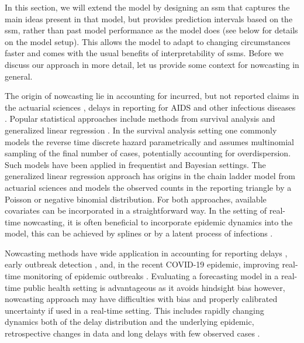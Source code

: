 In this section, we will extend the \ilmpropbig model by designing an \gls{ssm} that captures the main ideas present in that model, but provides prediction intervals based on the \gls{ssm}, rather than past model performance as the \ilmpropbig model does (see below for details on the model setup). This allows the model to adapt to changing circumstances faster and comes with the usual benefits of interpretability of \glspl{ssm}. Before we discuss our approach in more detail, let us provide some context for nowcasting in general.

The origin of nowcasting lie in accounting for incurred, but not reported claims in the actuarial sciences \citep{Kaminsky1987Prediction}, delays in reporting for AIDS \citep{Zeger1989Statistical,Lawless1994Adjustments} and other infectious diseases \citep{Farrington1996Statistical}. Popular statistical approaches include methods from survival analysis \citep{Lawless1994Adjustments} and generalized linear regression \citep{Zeger1989Statistical}. In the survival analysis setting one commonly models the reverse time discrete hazard parametrically and assumes multinomial sampling of the final number of cases, potentially accounting for overdispersion. Such models have been applied in frequentist \citep{Midthune2005Modeling} and Bayesian \citep{Hohle2014Bayesian,AnDerHeiden2020Schatzung} settings. The generalized linear regression approach has origins in the chain ladder model from actuarial sciences \citep{Renshaw1998Stochastic} and models the observed counts in the reporting triangle by a Poisson or negative binomial distribution.
For both approaches, available covariates can be incorporated in a straightforward way. In the setting of real-time nowcasting, it is often beneficial to incorporate epidemic dynamics into the model, this can be achieved by splines \citep{Hohle2014Bayesian,vandeKassteele2019Nowcasting} or by a latent process of infections \citep{McGough2020Nowcasting}.

Nowcasting methods have wide application in accounting for reporting delays \citep{Midthune2005Modeling}, early outbreak detection \citep{Salmon2015Bayesian,Bastos2019Modelling}, and, in the recent COVID-19 epidemic, improving real-time monitoring of epidemic outbreaks \citep{AnDerHeiden2020Schatzung,Gunther2021Nowcasting,Schneble2021Nowcasting,Akhmetzhanov2021Estimation}. Evaluating a forecasting model in a real-time public health setting is advantageous as it avoids hindsight bias \citep{Desai2019Realtime} however, nowcasting approach may have difficulties with bias and properly calibrated uncertainty if used in a real-time setting. This includes rapidly changing dynamics \citep{Gunther2021Nowcasting,vandeKassteele2019Nowcasting} both of the delay distribution and the underlying epidemic, retrospective changes in data \citep{Midthune2005Modeling} and long delays with few observed cases \citep{Noufaily2015Modelling}. 

